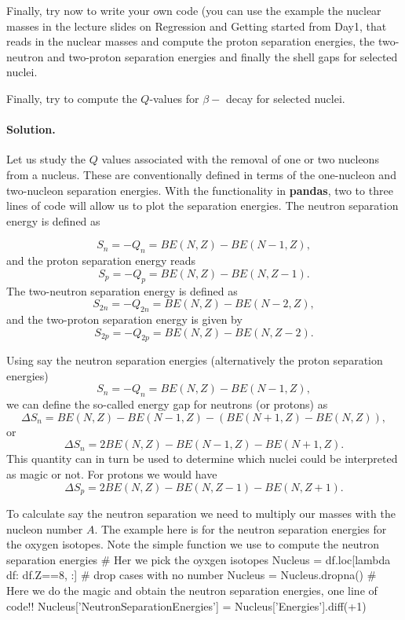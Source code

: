 \documentclass[%
oneside,                 %
final,                   %
10pt]{article}
\newenvironment{doconceexercise}{}{}
\newcounter{doconceexercisecounter}
\begin{document}
\begin{doconceexercise}



Finally, try now to write your own code (you can use the example the nuclear masses in the lecture slides on Regression and Getting started from Day1, that reads in the nuclear masses and
compute the proton separation energies, the two-neutron and two-proton separation energies and finally the shell gaps for selected nuclei.

Finally, try to compute the $Q$-values for $\beta-$ decay for selected nuclei.


\paragraph{Solution.}
Let us study the $Q$ values associated with the removal of one or two nucleons from
a nucleus. These are conventionally defined in terms of the one-nucleon and two-nucleon
separation energies. With the functionality in \textbf{pandas}, two to three lines of code will allow us to plot the separation energies.
The neutron separation energy is defined as 

\[
S_n= -Q_n= BE(N,Z)-BE(N-1,Z),
\]
and the proton separation energy reads
\[
S_p= -Q_p= BE(N,Z)-BE(N,Z-1).
\]
The two-neutron separation energy is defined as
\[
S_{2n}= -Q_{2n}= BE(N,Z)-BE(N-2,Z),
\]
and  the two-proton separation energy is given by
\[
S_{2p}= -Q_{2p}= BE(N,Z)-BE(N,Z-2).
\]

Using say the neutron separation energies (alternatively the proton separation energies)
\[
S_n= -Q_n= BE(N,Z)-BE(N-1,Z),
\]
we can define the so-called energy gap for neutrons (or protons) as 
\[
\Delta S_n= BE(N,Z)-BE(N-1,Z)-\left(BE(N+1,Z)-BE(N,Z)\right),
\]
or 
\[
\Delta S_n= 2BE(N,Z)-BE(N-1,Z)-BE(N+1,Z).
\]
This quantity can in turn be used to determine which nuclei could be interpreted as  magic or not. 
For protons we would have 
\[
\Delta S_p= 2BE(N,Z)-BE(N,Z-1)-BE(N,Z+1).
\]

To calculate say the neutron separation we need to multiply our masses with the nucleon number $A$.
The example here is for the neutron separation energies for the oxygen isotopes.
Note the simple function we use to compute the neutron separation energies
\bpycod
# Her we pick the oyxgen isotopes
Nucleus = df.loc[lambda df: df.Z==8, :]
# drop cases with no number
Nucleus = Nucleus.dropna()
# Here we do the magic and obtain the neutron separation energies, one line of code!!
Nucleus['NeutronSeparationEnergies'] = Nucleus['Energies'].diff(+1)
\epycod


\end{doconceexercise}
\end{document}

